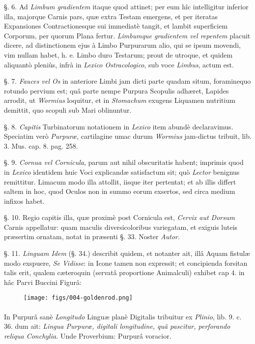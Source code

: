 \documentclass[a4paper, 11pt, oneside, polutonikogreek, german]{article}
\begin{document}
§. 6. Ad \emph{Limbum gradientem} itaque quod attinet; per eum hîc intelligitur inferior illa, majorque Carnis pars, quæ extra Testam emergens, et per iteratas Expansiones Contractionesque sui immediatè tangit, et lambit superficiem Corporum, per quorum Plana fertur. \emph{Limbumque gradientem vel repentem} placuit dicere, ad distinctionem ejus à Limbo Purpurarum alio, qui se ipsum movendi, vim nullam habet, h. e. Limbo duro Testarum; prout de utroque, et quidem aliquantò pleniùs, infrà in \emph{Lexico Ostracologico}, sub voce \emph{Limbus}, actum est.

§. 7. \emph{Fauces vel Os} in anteriore Limbi jam dicti parte quadam situm, foraminequo rotundo pervium est; quâ parte nempe Purpura Scopulis adhæret, Lapides arrodit, ut \emph{Wormius} loquitur, et in \emph{Stomachum} exugens Liquamen nutritium demittit, quo scopuli sub Mari oblinuntur.

§. 8. \emph{Capitis} Turbinatorum notationem in \emph{Lexico} item abundè declaravimus. Speciatim verò \emph{Purpuræ}, cartilagine umac durum \emph{Wormius} jam-dictus tribuit, lib. 3. Mus. cap. 8. pag. 258.

§. 9. \emph{Cornua vel Cornicula}, parum aut nihil obscuritatis habent; imprimis quod in \emph{Lexico} identidem huic Voci explicandæ satisfactum sit; quò \emph{Lector} benignus remittitur. Limacum modo illa attollit, iisque iter pertentat; et ab illis differt saltem in hoc, quod Oculos non in summo eorum exsertos, sed circa medium infixos habet.

§. 10. Regio capitis illa, quæ proximè post Cornicula est, \emph{Cervix aut Dorsum} Carnis appellatur: quam maculis diversicoloribus variegatam, et exiguis luteis præsertim ornatam, notat in præsenti §. 33. Noster \emph{Autor}.

§. 11. \emph{Linguam Idem} (§. 34.) describit quidem, et notanter ait, illâ Aquam fistulæ modo exspuere, \emph{Se Vidisse}: in Icone tamen non expressit; et concipienda forsitan talis erit, qualem cæteroquin (servatâ proportione Animalculi) exhibet cap 4. in hâc Parvi Buccini Figurâ:

\begin{figure}[H]
\centering
\texttt{[image: figs/004-goldenrod.png]}
\end{figure}
\paragraph{}
In Purpurâ sanè \emph{Longitudo} Linguæ planè Digitalis tribuitur ex \emph{Plinio}, lib. 9. c. 36. dum ait: \emph{Lingua Purpuræ, digitali longitudine, quâ pascitur, perforando reliqua Conchylia.} Unde Proverbium: Purpurâ voracior.
\end{document}
